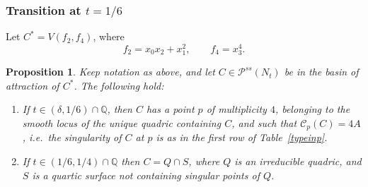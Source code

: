 \documentclass[11pt]{amsart}
\numberwithin{equation}{section}
\theoremstyle{plain}
\newtheorem{proposition}[theorem]{Proposition}
\theoremstyle{remark}
\theoremstyle{definition}
\newcommand{\cC}{{\mathscr C}}
\newcommand{\cP}{{\mathscr P}}
\newcommand{\QQ}{{\mathbb Q}}
\begin{document}
 \subsubsection{Transition at $t=1/6$}
Let $C^{*}=V(f_2,f_4)$, where
%
\begin{equation}
%
f_2=x_0 x_2 +x_1^2,\qquad f_4=x_3^4.
%
\end{equation}
%
\begin{proposition}\label{prp:unsesto}
%
Keep notation as above, and let $C\in\cP^{ss}(N_t)$ be in  the basin of attraction of $C^{*}$. The following hold:
%
\begin{enumerate}
%
\item
%
If  $t\in (\delta,1/6)\cap\QQ$, then $C$ has a point $p$ of multiplicity $4$, belonging to the smooth locus of the unique quadric containing $C$, and such that $\cC_p(C)=4A$, i.e.~the singularity of $C$ at $p$ is as in the first row of Table~\ref{typeinp}. 
%
\item
%
If  $t\in (1/6,1/4)\cap\QQ$ then $C=Q\cap S$, where $Q$ is an irreducible quadric, and $S$ is a quartic surface  not containing singular points of $Q$. 
% 
\end{enumerate}
%
%
\end{proposition}
%
\end{document}
